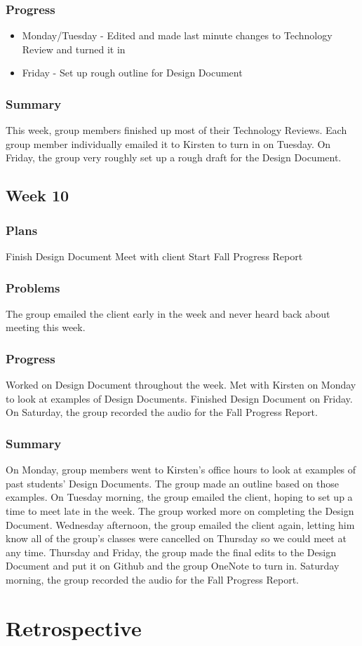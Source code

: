 \documentclass[onecolumn, draftclsnofoot,10pt, compsoc]{IEEEtran}
\begin{document}
\subsubsection{Progress}
\begin{itemize}
\item Monday/Tuesday - Edited and made last minute changes to Technology Review and turned it in
\item Friday - Set up rough outline for Design Document
\end{itemize}
\subsubsection{Summary}
This week, group members finished up most of their Technology Reviews. Each group member individually emailed it to Kirsten to turn in on Tuesday. On Friday, the group very roughly set up a rough draft for the Design Document.
\subsection{Week 10}

\subsubsection{Plans}
\begin{itemize}
Finish Design Document
Meet with client
Start Fall Progress Report

\end{itemize}
\subsubsection{Problems}
The group emailed the client early in the week and never heard back about meeting this week. 

\subsubsection{Progress}
Worked on Design Document throughout the week.  Met with Kirsten on Monday to look at examples of Design Documents. Finished Design Document on Friday. On Saturday, the group recorded the audio for the Fall Progress Report. 

\subsubsection{Summary}
On Monday, group members went to Kirsten's office hours to look at examples of past students' Design Documents. The group made an outline based on those examples. On Tuesday morning, the group emailed the client, hoping to set up a time to meet late in the week. The group worked more on completing the Design Document. Wednesday afternoon, the group emailed the client again, letting him know all of the group's classes were cancelled on Thursday so we could meet at any time. Thursday and Friday, the group made the final edits to the Design Document and put it on Github and the group OneNote to turn in. Saturday morning, the group recorded the audio for the Fall Progress Report. 

\section{Retrospective}
\end{document}
